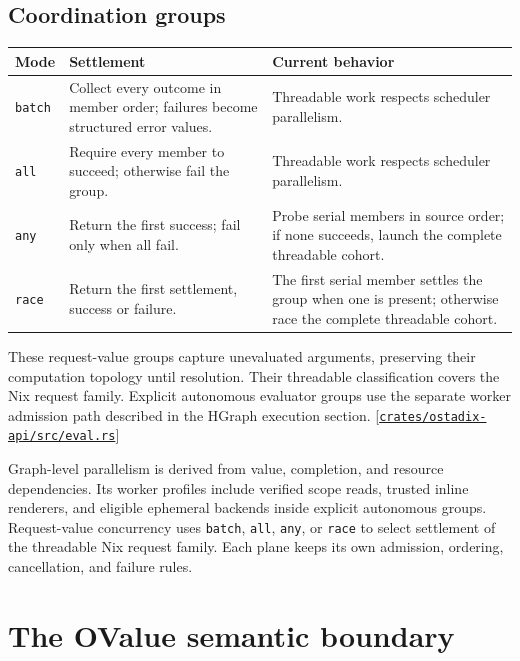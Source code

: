 \documentclass[11pt,oneside]{article}
\newcommand{\src}[1]{\textcolor{OSlate}{\scriptsize[\href{https://github.com/lostadi/OSTADIX/blob/c0b02c326b2329a95ba52447c7180bc93957cd57/#1}{\nolinkurl{#1}}]}\allowbreak}
\begin{document}
\subsection{Coordination groups}

\begin{longtable}{P{0.16\textwidth} P{0.40\textwidth} P{0.36\textwidth}}
\toprule
\textbf{Mode} & \textbf{Settlement} & \textbf{Current behavior} \\
\midrule
\endhead
\texttt{batch} &
Collect every outcome in member order; failures become structured error
values. &
Threadable work respects scheduler parallelism. \\
\texttt{all} &
Require every member to succeed; otherwise fail the group. &
Threadable work respects scheduler parallelism. \\
\texttt{any} &
Return the first success; fail only when all fail. &
Probe serial members in source order; if none succeeds, launch the complete
threadable cohort. \\
\texttt{race} &
Return the first settlement, success or failure. &
The first serial member settles the group when one is present; otherwise race
the complete threadable cohort. \\
\bottomrule
\end{longtable}

These request-value groups capture unevaluated arguments, preserving their
computation topology until resolution. Their threadable classification covers
the Nix request family. Explicit autonomous evaluator groups use the separate
worker admission path described in the HGraph execution section.
\src{crates/ostadix-api/src/eval.rs}

\begin{claimbox}
Graph-level parallelism is derived from value, completion, and resource
dependencies. Its worker profiles include verified scope reads, trusted inline
renderers, and eligible ephemeral backends inside explicit autonomous groups.
Request-value concurrency uses \texttt{batch}, \texttt{all}, \texttt{any},
or \texttt{race} to select settlement of the threadable Nix request family.
Each plane keeps its own admission, ordering, cancellation, and failure rules.
\end{claimbox}

\section{The OValue semantic boundary}
\label{sec:ovalue}
\end{document}
